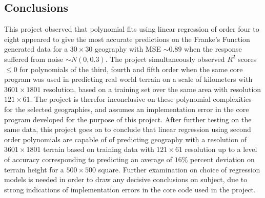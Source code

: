 \documentclass[%
oneside,                 %
final,                   %
10pt]{article}
\begin{document}
\subsection{Conclusions}
This project observed that polynomial fits using linear regression of order four to eight appeared to give the most accurate predictions on the Franke's Function generated data for a $30 \times 30$ geography with MSE $\sim 0.89$ when the response suffered from noise $\sim N(0,0.3)$. The project simultaneously observed $R^2$ scores$\leq 0$ for polynomials of the third, fourth and fifth order when the same core program was used in predicting real world terrain on a scale of kilometers with $3601 \times 1801$ resolution, based on a training set over the same area with resolution $121 \times 61$. The project is therefor inconclusive on these polynomial complexities for the selected geographies, and assumes an implementation error in the core program developed for the purpose of this project. After further testing on the same data, this project goes on to conclude that linear regression using second order polynomials are capable of of predicting geography with a resolution of  $3601 \times 1801$ terrain based on training data with $121 \times 61$ resolution up to a level of accuracy corresponding to predicting an average of $16\%$ percent deviation on terrain height for a $500 \times 500$ square. Further examination on choice of regression models is needed in order to draw any decisive conclusions on subject, due to  strong indications of implementation errors in the core code used in the project.






\end{document}
